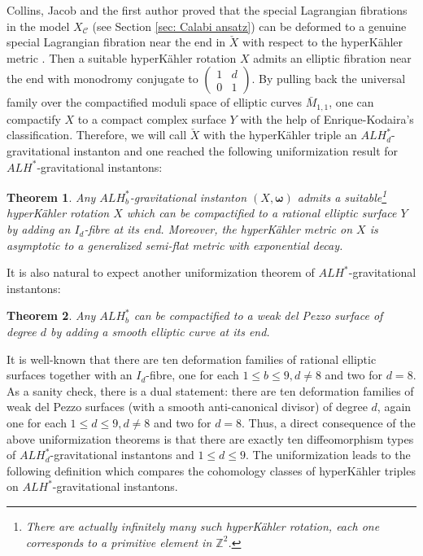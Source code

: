 \documentclass[11pt]{amsart}
\theoremstyle{plain}
\newtheorem{thm}{Theorem}[section]
\theoremstyle{definition}
\numberwithin{equation}{section}
\renewcommand{\leq}{\leqslant}
\begin{document}
   Collins, Jacob and the first author proved that the special Lagrangian fibrations in the model $X_{\mathcal{C}}$ (see Section \ref{sec: Calabi ansatz}) can be deformed to a genuine special Lagrangian fibration near the end in $\check{X}$ with respect to the hyperK\"ahler metric \cite{CJL}. Then a suitable hyperK\"ahler rotation ${X}$ admits an elliptic fibration near the end with monodromy conjugate to $\begin{pmatrix} 1 & d \\ 0 & 1\end{pmatrix}$. By pulling back the universal family over the compactified moduli space of elliptic curves $\bar{M}_{1,1}$, one can compactify ${X}$ to a compact complex surface ${Y}$ with the help of Enrique-Kodaira's classification. Therefore, we will call $\check{X}$ with the hyperK\"ahler triple an $ALH^*_d$-gravitational instanton and one reached the following uniformization result for $ALH^*$-gravitational instantons:
  \begin{thm} \cite{CJL3}\cite{HSVZ2}\label{uniformization}
  	  Any $ALH_b^*$-gravitational instanton $(X,\boldsymbol{\omega})$ admits a suitable\footnote{There are actually infinitely many such hyperK\"ahler rotation, each one corresponds to a primitive element in $\mathbb{Z}^2$.} hyperK\"ahler rotation ${X}$ which can be compactified to a rational elliptic surface ${Y}$ by adding an $I_d$-fibre at its end. Moreover, the hyperK\"ahler metric on ${X}$ is asymptotic to a generalized semi-flat metric with exponential decay. 
  \end{thm} 
  It is also natural to expect another uniformization theorem of $ALH^*$-gravitational instantons:
  \begin{thm} \cite{HSVZ2} \cite{CL} \label{uniformization theorem}
  	 Any $ALH_b^*$ can be compactified to a weak del Pezzo surface of degree $d$ by adding a smooth elliptic curve at its end. 
  \end{thm}
  It is well-known that there are ten deformation families of rational elliptic surfaces together with an $I_d$-fibre, one for each $1\leq b\leq 9, d\neq 8$ and two for $d=8$. As a sanity check, there is a dual statement: there are ten deformation families of weak del Pezzo surfaces (with a smooth anti-canonical divisor) of degree $d$, again one for each $1\leq d\leq 9, d\neq 8$ and two for $d=8$. Thus, a direct consequence of the above uniformization theorems is that there are exactly ten diffeomorphism types of $ALH^*_d$-gravitational instantons and $1\leq d\leq 9$. 
  The uniformization leads to the following definition which compares the cohomology classes of hyperK\"ahler triples on $ALH^*$-gravitational instantons. 
\end{document}

